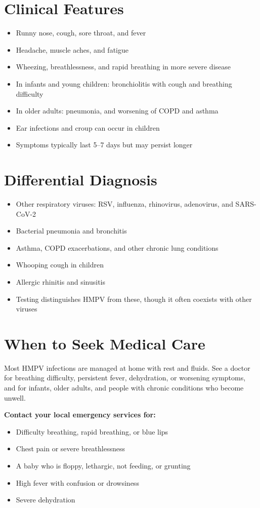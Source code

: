\section*{Clinical Features}
\begin{itemize}
    \item Runny nose, cough, sore throat, and fever
    \item Headache, muscle aches, and fatigue
    \item Wheezing, breathlessness, and rapid breathing in more severe disease
    \item In infants and young children: bronchiolitis with cough and breathing difficulty
    \item In older adults: pneumonia, and worsening of COPD and asthma
    \item Ear infections and croup can occur in children
    \item Symptoms typically last 5--7 days but may persist longer
\end{itemize}

\section*{Differential Diagnosis}
\begin{itemize}
    \item Other respiratory viruses: RSV, influenza, rhinovirus, adenovirus, and SARS-CoV-2
    \item Bacterial pneumonia and bronchitis
    \item Asthma, COPD exacerbations, and other chronic lung conditions
    \item Whooping cough in children
    \item Allergic rhinitis and sinusitis
    \item Testing distinguishes HMPV from these, though it often coexists with other viruses
\end{itemize}

\section*{When to Seek Medical Care}
Most HMPV infections are managed at home with rest and fluids. See a doctor for breathing difficulty, persistent fever, dehydration, or worsening symptoms, and for infants, older adults, and people with chronic conditions who become unwell.

\textbf{Contact your local emergency services for:}
\begin{itemize}
    \item Difficulty breathing, rapid breathing, or blue lips
    \item Chest pain or severe breathlessness
    \item A baby who is floppy, lethargic, not feeding, or grunting
    \item High fever with confusion or drowsiness
    \item Severe dehydration
\end{itemize}

